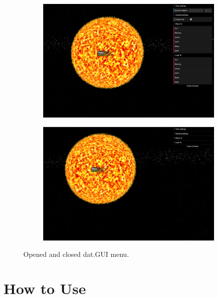 \documentclass[paper=a4, fontsize=11pt]{scrartcl} %
\numberwithin{equation}{section} %
\numberwithin{figure}{section} %
\numberwithin{table}{section} %
\theoremstyle{definition}
\begin{document}
\begin{figure}
	\centering
	\begin{subfigure}{.48\textwidth}
		\centering
		\includegraphics[width=1.0\linewidth]{images/menu2.png}
	\end{subfigure}
	\begin{subfigure}{.48\textwidth}
		\centering
		\includegraphics[width=1.0\linewidth]{images/menu1.png}
	\end{subfigure}
	\caption{Opened and closed dat.GUI menu.}
	\label{fig:menu}
\end{figure}


\section{How to Use}
\end{document}
